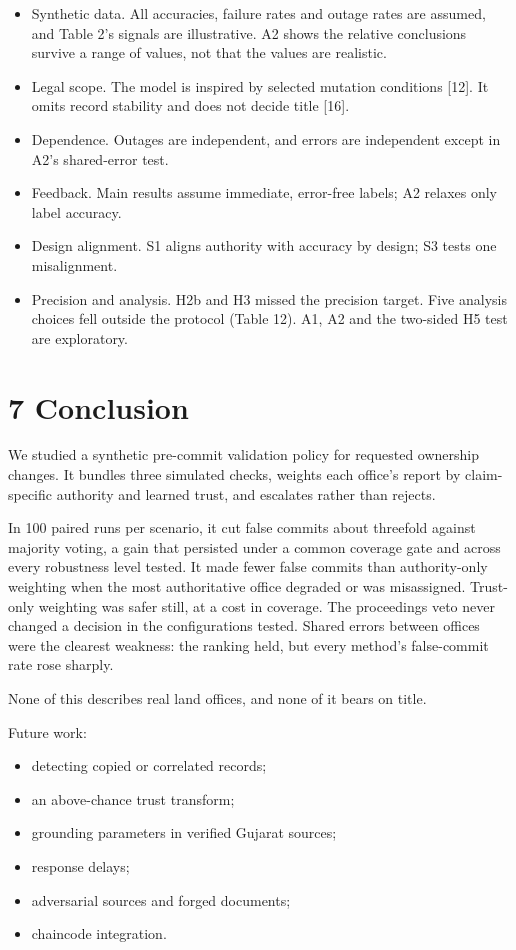 \documentclass[10pt]{article}
\begin{document}
\begin{itemize}
\item Synthetic data. All accuracies, failure rates and outage rates are assumed, and Table 2's signals are illustrative. A2 shows the relative conclusions survive a range of values, not that the values are realistic.
\item Legal scope. The model is inspired by selected mutation conditions [12]. It omits record stability and does not decide title [16].
\item Dependence. Outages are independent, and errors are independent except in A2's shared-error test.
\item Feedback. Main results assume immediate, error-free labels; A2 relaxes only label accuracy.
\item Design alignment. S1 aligns authority with accuracy by design; S3 tests one misalignment.
\item Precision and analysis. H2b and H3 missed the precision target. Five analysis choices fell outside the protocol (Table 12). A1, A2 and the two-sided H5 test are exploratory.
\end{itemize}
\section*{7 Conclusion}
We studied a synthetic pre-commit validation policy for requested ownership changes. It bundles three simulated checks, weights each office's report by claim-specific authority and learned trust, and escalates rather than rejects.

In 100 paired runs per scenario, it cut false commits about threefold against majority voting, a gain that persisted under a common coverage gate and across every robustness level tested. It made fewer false commits than authority-only weighting when the most authoritative office degraded or was misassigned. Trust-only weighting was safer still, at a cost in coverage. The proceedings veto never changed a decision in the configurations tested. Shared errors between offices were the clearest weakness: the ranking held, but every method's false-commit rate rose sharply.

None of this describes real land offices, and none of it bears on title.

Future work:

\begin{itemize}
\item detecting copied or correlated records;
\item an above-chance trust transform;
\item grounding parameters in verified Gujarat sources;
\item response delays;
\item adversarial sources and forged documents;
\item chaincode integration.
\end{itemize}
\end{document}
